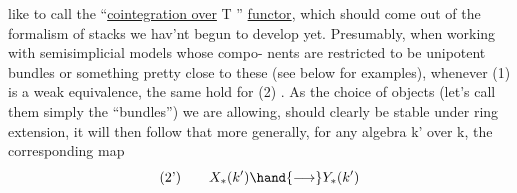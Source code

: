 like to call the ``\uline{cointegration over} T ''  \uline{functor},  which should come
out of the formalism of stacks we hav'nt  begun to  develop yet.\hand{)}
Presumably,  when working with  semisimplicial models whose compo-%
nents are restricted  to be unipotent bundles or something pretty close
to these (see below for examples),  whenever (1) is a weak equivalence,
the same  hold for (2) .  As the choice of objects (let's call them
simply the ``bundles'') we are allowing,  should clearly be stable under
ring extension,  it will then follow that more generally,  for any
algebra k' over k,  the corresponding map
\[
\text{(2')}\qquad X_{*}(k') \hand{\longrightarrow} Y_{*}(k')
\]


